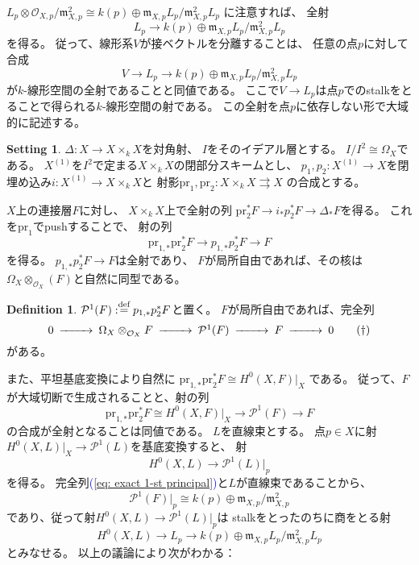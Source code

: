 \documentclass[uplatex]{jsarticle}
\renewcommand{\eqref}[1]{\textcolor{blue}{(\ref{#1})}}
\theoremstyle{definition}
\newtheorem{defi}[defi]{Definition}
\newtheorem*{setting*}{Setting}
\newcommand{\mcO}{\mathcal{O}}
\newcommand{\mcP}{\mathcal{P}}
\DeclareMathOperator{\OOO}{\mcO}
\newcommand{\OX}{{\OOO_X}}
\def\dfn{:\overset{\mbox{{\scriptsize def}}}{=}}
\begin{document}
\(L_p\otimes \mathcal{O}_{X,p}/\mathfrak{m}_{X,p}^2
\cong k(p) \oplus \mathfrak{m}_{X,p}L_p/\mathfrak{m}_{X,p}^2L_p\)
に注意すれば、
全射
\[L_p\to k(p) \oplus \mathfrak{m}_{X,p}L_p/\mathfrak{m}_{X,p}^2L_p\]
を得る。
従って、線形系\(V\)が接ベクトルを分離することは、
任意の点\(p\)に対して合成
\[
V\to L_p \to k(p) \oplus \mathfrak{m}_{X,p}L_p/\mathfrak{m}_{X,p}^2L_p
\]
が\(k\)-線形空間の全射であることと同値である。
ここで\(V\to L_p\)は点\(p\)でのstalkをとることで得られる\(k\)-線形空間の射である。
この全射を点\(p\)に依存しない形で大域的に記述する。

\begin{setting*}
  \(\Delta:X\to X\times_k X\)を対角射、
  \(I\)をそのイデアル層とする。
  \(I/I^2\cong \Omega_X\)である。
  \(X^{(1)}\)を\(I^2\)で定まる\(X\times_kX\)の閉部分スキームとし、
  \(p_1,p_2:X^{(1)}\to X\)を閉埋め込み\(i:X^{(1)}\to X\times_kX\)と
  射影\(\mathrm{pr}_1,\mathrm{pr}_2: X\times_kX\rightrightarrows X\)
  の合成とする。
\end{setting*}


\(X\)上の連接層\(F\)に対し、
\(X\times_kX\)上で全射の列
\(\mathrm{pr}_2^*F\to i_*p_2^*F\to \Delta_*F\)を得る。
これを\(\mathrm{pr}_1\)でpushすることで、
射の列
\[\mathrm{pr}_{1,*}\mathrm{pr}_2^*F\to p_{1,*}p_2^*F\to F\]
を得る。
\(p_{1,*}p_2^*F\to F\)は全射であり、
\(F\)が局所自由であれば、その核は\(\Omega_X\otimes_{\OX}(F)\)と自然に同型である。

\begin{defi}
  \(\mcP^1(F)\dfn p_{1,*}p_2^*F\)と置く。
  \(F\)が局所自由であれば、完全列
  \begin{equation}\label{eq: exact 1-st principal}
    \begin{CD}
      0 @>>> \Omega_X\otimes_{\OX}F @>>> \mcP^1(F) @>>> F @>>> 0
    \end{CD}
    \tag{\(\dagger\)}
  \end{equation}
  がある。
\end{defi}

また、平坦基底変換により自然に
\(\mathrm{pr}_{1,*}\mathrm{pr}_2^*F\cong H^0(X,F)|_X\)
である。
従って、\(F\)が大域切断で生成されることと、射の列
\[\mathrm{pr}_{1,*}\mathrm{pr}_2^*F\cong H^0(X,F)|_X \to \mcP^1(F)\to F\]
の合成が全射となることは同値である。
\(L\)を直線束とする。
点\(p\in X\)に射\(H^0(X,L)|_X\to \mcP^1(L)\)を基底変換すると、
射
\[H^0(X,L)\to \mcP^1(L)|_p\]
を得る。
完全列\eqref{eq: exact 1-st principal}と\(L\)が直線束であることから、
\[\mcP^1(F)|_p\cong k(p)\oplus \mathfrak{m}_{X,p}/\mathfrak{m}_{X,p}^2\]
であり、従って射\(H^0(X,L)\to \mcP^1(L)|_p\)は
stalkをとったのちに商をとる射
\[
H^0(X,L)\to L_p \to k(p) \oplus \mathfrak{m}_{X,p}L_p/\mathfrak{m}_{X,p}^2L_p
\]
とみなせる。
以上の議論により次がわかる：
\end{document}
